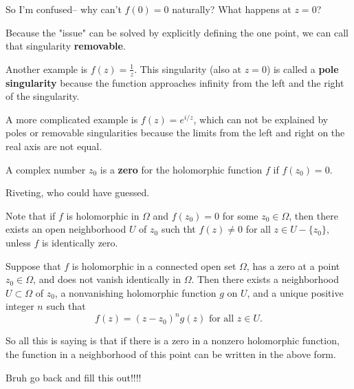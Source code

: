 \documentclass[12pt]{article}
\begin{document}
\begin{uq}
  So I'm confused-- why can't $f(0)=0$ naturally? What happens at $z=0$?
\end{uq}

Because the "issue" can be solved by explicitly defining the one point, we can call that singularity \textbf{removable}.

\par Another example is $f(z)=\frac{1}{z}$. This singularity (also at $z=0$) is called a \textbf{pole singularity}
because the function approaches infinity from the left and the right of the singularity.

\par A more complicated example is $f(z)=e^{i/z}$, which can not be explained by poles or removable singularities because 
the limits from the left and right on the real axis are not equal.

\begin{definition}
  A complex number $z_0$ is a \textbf{zero} for the holomorphic function $f$ if $f(z_0)=0$.
\end{definition}

Riveting, who could have guessed.

Note that if $f$ is holomorphic in $\Omega$ and $f(z_0)=0$ for some $z_0 \in \Omega$, then there exists an 
open neighborhood $U$ of $z_0$ such tht $f(z) \neq 0$ for all $z \in U - \{ z_0\}$, unless $f$ 
is identically zero.

\begin{theorem}{}
  Suppose that $f$ is holomorphic in a connected open set $\Omega$, has a zero at a point $z_0 \in \Omega$, and does not 
  vanish identically in $\Omega$. Then there exists a neighborhood $U \subset \Omega$ of $z_0$, a 
  nonvanishing holomorphic function $g$ on $U$, and a unique positive integer $n$ such that
  $$ f(z) = (z-z_0)^ng(z) \text{ for all } z \in U. $$
\end{theorem}

So all this is saying is that if there is a zero in a nonzero holomorphic function, the function in a neighborhood 
of this point can be written in the above form.

\begin{newproof}
  Bruh go back and fill this out!!!!
\end{newproof}
\end{document}
